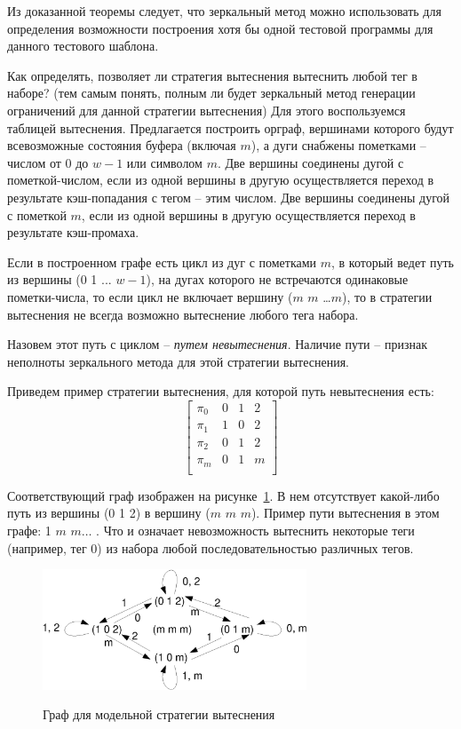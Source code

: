 Из доказанной теоремы следует, что зеркальный метод можно использовать
для определения возможности построения хотя бы одной тестовой программы
для данного тестового шаблона.

Как определять, позволяет ли стратегия вытеснения вытеснить любой
тег в наборе? (тем самым понять, полным ли будет зеркальный метод
генерации ограничений для данной стратегии вытеснения) Для этого
воспользуемся таблицей вытеснения. Предлагается построить орграф,
вершинами которого будут всевозможные состояния буфера (включая
$m$), а дуги снабжены пометками -- числом от 0 до $w-1$ или символом
$m$. Две вершины соединены дугой с пометкой-числом, если из одной
вершины в другую осуществляется переход в результате кэш-попадания с
тегом -- этим числом. Две вершины соединены дугой с пометкой $m$,
если из одной вершины в другую осуществляется переход в результате
кэш-промаха.

\begin{utv}
Если в построенном графе есть цикл из дуг с пометками $m$, в который
ведет путь из вершины (0 1 ... $w-1$), на дугах которого не
встречаются одинаковые пометки-числа, то если цикл не включает
вершину ($m$ $m$ \dots $m$), то в стратегии вытеснения не всегда
возможно вытеснение любого тега набора.
\end{utv}

Назовем этот путь с циклом -- \emph{путем невытеснения}. Наличие
пути -- признак неполноты зеркального метода для этой стратегии
вытеснения.

Приведем пример стратегии вытеснения, для которой путь невытеснения
есть:
$$\left[
  \begin{array}{c|cccc}
    \pi_0 & 0 & 1 & 2 \\
    \pi_1 & 1 & 0 & 2 \\
    \pi_2 & 0 & 1 & 2 \\
    \pi_m & 0 & 1 & m \\
  \end{array}
\right]
$$

Соответствующий граф изображен на рисунке~\ref{badpolicy}. В нем
отсутствует какой-либо путь из вершины (0 1 2) в вершину ($m$ $m$
$m$). Пример пути вытеснения в этом графе: 1 $m$ $m \dots$ . Что и
означает невозможность вытеснить некоторые теги (например, тег 0) из
набора любой последовательностью различных тегов.
\begin{figure}[h]\center
  \includegraphics[width=0.7\textwidth]{2.theor/badpolicy}\\
  \caption{Граф для модельной стратегии вытеснения}\label{badpolicy}
\end{figure}

